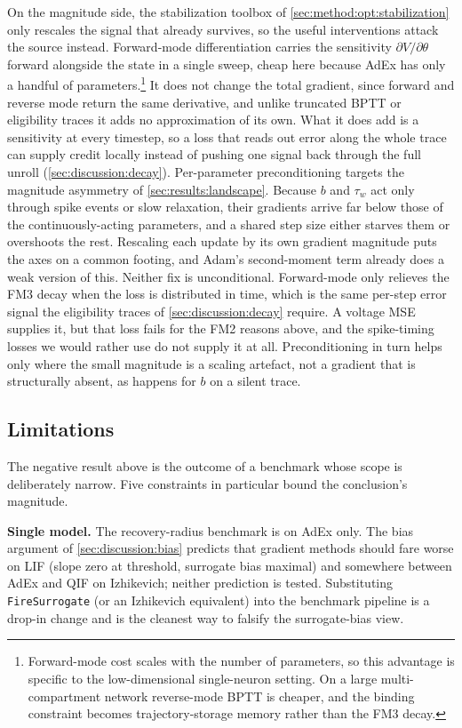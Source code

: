 On the magnitude side, the stabilization toolbox of \cref{sec:method:opt:stabilization} only rescales the signal that already survives, so the useful interventions attack the source instead.
Forward-mode differentiation carries the sensitivity $\partial V/\partial\theta$ forward alongside the state in a single sweep, cheap here because \gls{AdEx} has only a handful of parameters.\footnote{Forward-mode cost scales with the number of parameters, so this advantage is specific to the low-dimensional single-neuron setting. On a large multi-compartment network reverse-mode \gls{BPTT} is cheaper, and the binding constraint becomes trajectory-storage memory rather than the FM3 decay.}
It does not change the total gradient, since forward and reverse mode return the same derivative, and unlike truncated \gls{BPTT} or eligibility traces it adds no approximation of its own.
What it does add is a sensitivity at every timestep, so a loss that reads out error along the whole trace can supply credit locally instead of pushing one signal back through the full unroll (\cref{sec:discussion:decay}).
Per-parameter preconditioning targets the magnitude asymmetry of \cref{sec:results:landscape}.
Because $b$ and $\tau_w$ act only through spike events or slow relaxation, their gradients arrive far below those of the continuously-acting parameters, and a shared step size either starves them or overshoots the rest.
Rescaling each update by its own gradient magnitude puts the axes on a common footing, and Adam's second-moment term already does a weak version of this.
Neither fix is unconditional.
Forward-mode only relieves the FM3 decay when the loss is distributed in time, which is the same per-step error signal the eligibility traces of \cref{sec:discussion:decay} require.
A voltage \gls{MSE} supplies it, but that loss fails for the FM2 reasons above, and the spike-timing losses we would rather use do not supply it at all.
Preconditioning in turn helps only where the small magnitude is a scaling artefact, not a gradient that is structurally absent, as happens for $b$ on a silent trace.

\subsection{Limitations}\label{sec:discussion:limitations}
The negative result above is the outcome of a benchmark whose scope is deliberately narrow.
Five constraints in particular bound the conclusion's magnitude.

\textbf{Single model.}
The recovery-radius benchmark is on \gls{AdEx} only.
The bias argument of \cref{sec:discussion:bias} predicts that gradient methods should fare worse on \gls{LIF} (slope zero at threshold, surrogate bias maximal) and somewhere between \gls{AdEx} and \gls{QIF} on Izhikevich; neither prediction is tested.
Substituting \texttt{FireSurrogate} (or an Izhikevich equivalent) into the benchmark pipeline is a drop-in change and is the cleanest way to falsify the surrogate-bias view.

